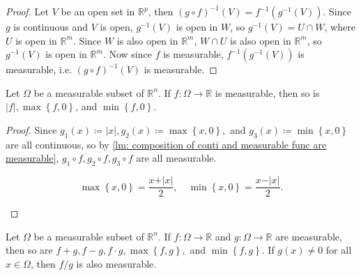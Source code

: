 \begin{proof}
    Let \(V\) be an open set in \(\mathbb{R} ^p\), then \((g \circ f)^{-1}(V) = f^{-1} \left( g^{-1}(V) \right) \). Since \(g\) is continuous and \(V\) is open, \(g^{-1}(V)\) is open in \(W\), so \(g^{-1}(V) = U \cap W\), where \(U\) is open in \(\mathbb{R} ^m\). Since \(W\) is also open in \(\mathbb{R} ^m\), \(W \cap U\) is also open in \(\mathbb{R} ^m\), so \(g^{-1}(V)\) is open in \(\mathbb{R} ^m\). Now since \(f\) is measurable, \(f^{-1} \left( g^{-1}(V) \right) \) is measurable, i.e. \((g \circ f)^{-1} (V)\) is measurable.                  
\end{proof}

\begin{corollary}
    Let \(\Omega \) be a measurable subset of \(\mathbb{R} ^n\).  If \(f: \Omega \to \mathbb{R} \) is measurable, then so is \(\vert f \vert, \max \left\{ f, 0 \right\}  \), and \(\min \left\{ f, 0 \right\} \).
\end{corollary}

\begin{proof}
    Since \(g_1(x) \coloneqq \vert x \vert, g_2(x) \coloneqq \max \left\{ x, 0 \right\}, \) and \(g_3(x) \coloneqq \min \left\{ x, 0 \right\} \) are all continuous, so by \autoref{lm: composition of conti and measurable func are measurable}, \(g_1 \circ f, g_2 \circ f, g_3 \circ f\) are all measurable. 
    \begin{remark}
        \[
            \max \left\{ x, 0 \right\} = \frac{x + \vert x \vert }{2}, \quad \min \left\{ x, 0 \right\} = \frac{x - \vert x \vert }{2}. 
        \]
    \end{remark} 
\end{proof}

\begin{corollary} \label{cl: measurable func plus, minus, ... is measurable}
    Let \(\Omega \) be a measurable subset of \(\mathbb{R} ^n\). If \(f: \Omega \to \mathbb{R} \) and \(g: \Omega \to \mathbb{R} \) are measurable, then so are \(f + g, f - g, f \cdot g, \max \left\{ f, g \right\}, \) and \(\min \left\{ f, g \right\} \). If \(g(x) \neq 0\) for all \(x \in \Omega \), then \(f / g\) is also measurable.         
\end{corollary}

